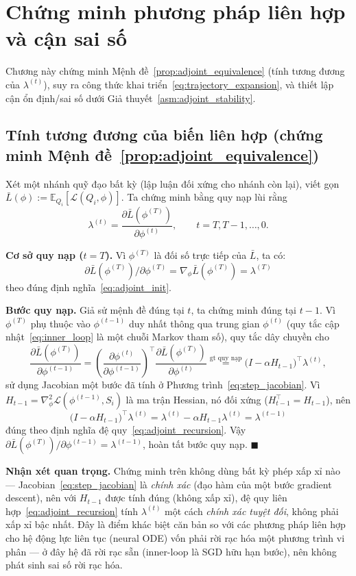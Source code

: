 \chapter{Chứng minh phương pháp liên hợp và cận sai số}
\label{appendix:adjoint_proof}

Chương này chứng minh Mệnh đề~\ref{prop:adjoint_equivalence} (tính tương đương của $\lambda^{(t)}$), suy ra công thức khai triển~\eqref{eq:trajectory_expansion}, và thiết lập cận ổn định/sai số dưới Giả thuyết~\ref{asm:adjoint_stability}.

\section{Tính tương đương của biến liên hợp (chứng minh Mệnh đề~\ref{prop:adjoint_equivalence})}

Xét một nhánh quỹ đạo bất kỳ (lập luận đối xứng cho nhánh còn lại), viết gọn $\bar{L}(\phi) := \mathbb{E}_{Q_i}[\mathcal{L}(Q_i,\phi)]$. Ta chứng minh bằng quy nạp lùi rằng
\[
    \lambda^{(t)} = \frac{\partial \bar{L}(\phi^{(T)})}{\partial \phi^{(t)}}, \qquad t = T, T-1, \dots, 0.
\]

\textbf{Cơ sở quy nạp ($t=T$).} Vì $\phi^{(T)}$ là đối số trực tiếp của $\bar{L}$, ta có:
\[
    \partial\bar{L}(\phi^{(T)})/\partial\phi^{(T)} = \nabla_\phi\bar{L}(\phi^{(T)}) = \lambda^{(T)}
\]
theo đúng định nghĩa~\eqref{eq:adjoint_init}.

\textbf{Bước quy nạp.} Giả sử mệnh đề đúng tại $t$, ta chứng minh đúng tại $t-1$. Vì $\phi^{(T)}$ phụ thuộc vào $\phi^{(t-1)}$ duy nhất thông qua trung gian $\phi^{(t)}$ (quy tắc cập nhật~\eqref{eq:inner_loop} là một chuỗi Markov tham số), quy tắc dây chuyền cho
\[
    \frac{\partial \bar L(\phi^{(T)})}{\partial \phi^{(t-1)}} = \left(\frac{\partial \phi^{(t)}}{\partial \phi^{(t-1)}}\right)^{\!\top} \frac{\partial \bar L(\phi^{(T)})}{\partial \phi^{(t)}} \overset{\text{gt quy nạp}}{=} \big(I-\alpha H_{t-1}\big)^{\top}\lambda^{(t)},
\]
sử dụng Jacobian một bước đã tính ở Phương trình~\eqref{eq:step_jacobian}. Vì $H_{t-1} = \nabla^2_\phi\mathcal{L}(\phi^{(t-1)},S_i)$ là ma trận Hessian, nó đối xứng ($H_{t-1}^\top = H_{t-1}$), nên
\[
    \big(I-\alpha H_{t-1}\big)^{\top}\lambda^{(t)} = \lambda^{(t)} - \alpha H_{t-1}\lambda^{(t)} = \lambda^{(t-1)}
\]
đúng theo định nghĩa đệ quy~\eqref{eq:adjoint_recursion}. Vậy $\partial\bar L(\phi^{(T)})/\partial\phi^{(t-1)} = \lambda^{(t-1)}$, hoàn tất bước quy nạp. $\blacksquare$

\textbf{Nhận xét quan trọng.} Chứng minh trên không dùng bất kỳ phép xấp xỉ nào — Jacobian~\eqref{eq:step_jacobian} là \emph{chính xác} (đạo hàm của một bước gradient descent), nên với $H_{t-1}$ được tính đúng (không xấp xỉ), đệ quy liên hợp~\eqref{eq:adjoint_recursion} tính $\lambda^{(t)}$ một cách \emph{chính xác tuyệt đối}, không phải xấp xỉ bậc nhất. Đây là điểm khác biệt căn bản so với các phương pháp liên hợp cho hệ động lực liên tục (neural ODE) vốn phải rời rạc hóa một phương trình vi phân — ở đây hệ đã rời rạc sẵn (inner-loop là SGD hữu hạn bước), nên không phát sinh sai số rời rạc hóa.

